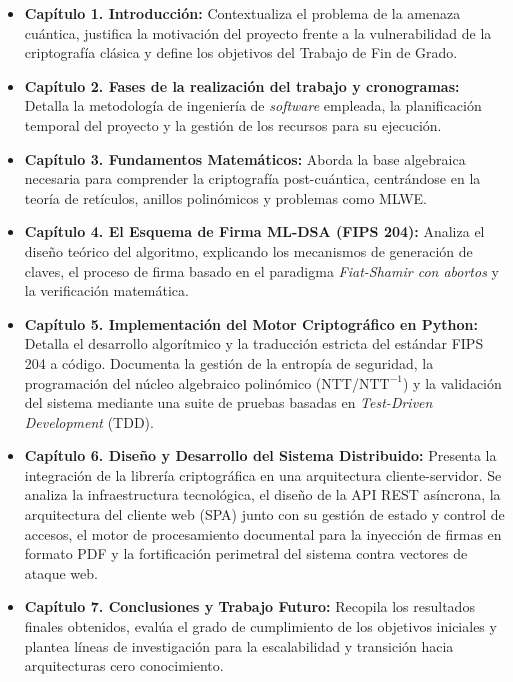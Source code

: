 \documentclass[11pt, a4paper]{report}
\theoremstyle{definition}
\begin{document}
\begin{itemize}
    \item \textbf{Capítulo 1. Introducción:} Contextualiza el problema de la amenaza cuántica, justifica la motivación del proyecto frente a la vulnerabilidad de la criptografía clásica y define los objetivos del Trabajo de Fin de Grado.
    
    \item \textbf{Capítulo 2. Fases de la realización del trabajo y cronogramas:} Detalla la metodología de ingeniería de \textit{software} empleada, la planificación temporal del proyecto y la gestión de los recursos para su ejecución.
    
    \item \textbf{Capítulo 3. Fundamentos Matemáticos:} Aborda la base algebraica necesaria para comprender la criptografía post-cuántica, centrándose en la teoría de retículos, anillos polinómicos y problemas como MLWE.
    
    \item \textbf{Capítulo 4. El Esquema de Firma ML-DSA (FIPS 204):} Analiza el diseño teórico del algoritmo, explicando los mecanismos de generación de claves, el proceso de firma basado en el paradigma \textit{Fiat-Shamir con abortos} y la verificación matemática.\cite{lyubashevsky2009fiat}
    
    \item \textbf{Capítulo 5. Implementación del Motor Criptográfico en Python:} Detalla el desarrollo algorítmico y la traducción estricta del estándar FIPS 204 a código. Documenta la gestión de la entropía de seguridad, la programación del núcleo algebraico polinómico (NTT/$\text{NTT}^{-1}$) y la validación del sistema mediante una suite de pruebas basadas en \textit{Test-Driven Development} (TDD).
    
    \item \textbf{Capítulo 6. Diseño y Desarrollo del Sistema Distribuido:} Presenta la integración de la librería criptográfica en una arquitectura cliente-servidor. Se analiza la infraestructura tecnológica, el diseño de la API REST asíncrona, la arquitectura del cliente web (SPA) junto con su gestión de estado y control de accesos, el motor de procesamiento documental para la inyección de firmas en formato PDF y la fortificación perimetral del sistema contra vectores de ataque web.
    
    \item \textbf{Capítulo 7. Conclusiones y Trabajo Futuro:} Recopila los resultados finales obtenidos, evalúa el grado de cumplimiento de los objetivos iniciales y plantea líneas de investigación para la escalabilidad y transición hacia arquitecturas cero conocimiento.
    
\end{itemize}
\end{document}
